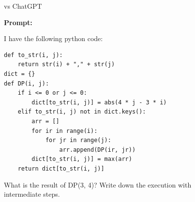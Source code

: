 \begin{figure}[H]
\begin{AIbox}{\DV vs ChatGPT}
\begin{minipage}[t]{0.15\linewidth}
{\bf Prompt:}
\end{minipage}
\begin{minipage}[t]{0.8\linewidth}
{\tiny
I have the following python code:}
\vspace{-0.1cm}
\begin{verbatim}
def to_str(i, j):
    return str(i) + "," + str(j)
dict = {}
def DP(i, j):
    if i <= 0 or j <= 0:
        dict[to_str(i, j)] = abs(4 * j - 3 * i) 
    elif to_str(i, j) not in dict.keys():
        arr = []
        for ir in range(i):
            for jr in range(j):
                arr.append(DP(ir, jr))
        dict[to_str(i, j)] = max(arr)
    return dict[to_str(i, j)]
\end{verbatim}
\vspace{-0.5cm}
{\tiny What is the result of DP(3, 4)? Write down the execution with intermediate steps.}\\
\end{minipage}
\vspace{-0.5cm}


\end{AIbox}
\end{figure}
